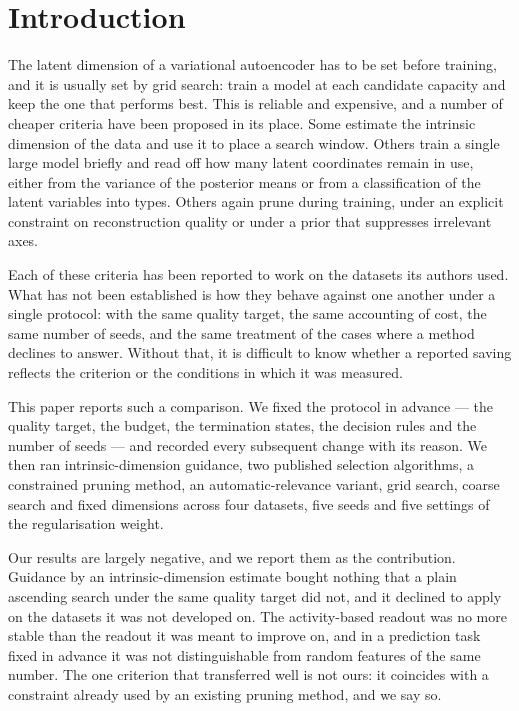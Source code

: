 \documentclass[make,article,submit,pdftex,moreauthors]{Definitions/mdpi}
\begin{document}

\section{Introduction}\label{sec:intro}

The latent dimension of a variational autoencoder has to be set before
training, and it is usually set by grid search: train a model at each
candidate capacity and keep the one that performs best. This is reliable
and expensive, and a number of cheaper criteria have been proposed in its
place. Some estimate the intrinsic dimension of the data and use it to
place a search window. Others train a single large model briefly and read
off how many latent coordinates remain in use, either from the variance of
the posterior means or from a classification of the latent variables into
types. Others again prune during training, under an explicit constraint on
reconstruction quality or under a prior that suppresses irrelevant axes.

Each of these criteria has been reported to work on the datasets its
authors used. What has not been established is how they behave against one
another under a single protocol: with the same quality target, the same
accounting of cost, the same number of seeds, and the same treatment of
the cases where a method declines to answer. Without that, it is difficult
to know whether a reported saving reflects the criterion or the conditions
in which it was measured.

This paper reports such a comparison. We fixed the protocol in advance ---
the quality target, the budget, the termination states, the decision rules
and the number of seeds --- and recorded every subsequent change with its
reason. We then ran intrinsic-dimension guidance, two published selection
algorithms, a constrained pruning method, an automatic-relevance variant,
grid search, coarse search and fixed dimensions across four datasets, five
seeds and five settings of the regularisation weight.

Our results are largely negative, and we report them as the contribution.
Guidance by an intrinsic-dimension estimate bought nothing that a plain
ascending search under the same quality target did not, and it declined to
apply on the datasets it was not developed on. The activity-based readout
was no more stable than the readout it was meant to improve on, and in a
prediction task fixed in advance it was not distinguishable from random
features of the same number. The one criterion that transferred well is
not ours: it coincides with a constraint already used by an existing
pruning method, and we say so.
\end{document}
